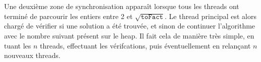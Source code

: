 \documentclass[a4paper,10pt]{article}
\begin{document}
Une deuxième zone de synchronisation apparaît lorsque tous les threads ont terminé de parcourir les entiers entre 2 et $\sqrt{\texttt{toFact}}$. Le thread principal est alors chargé de vérifier si une solution a été trouvée, et sinon de continuer l'algorithme avec le nombre suivant présent sur le heap. Il fait cela de manière très simple, en tuant les $n$ threads, effectuant les vérifcations, puis éventuellement en relançant $n$ nouveaux threads.
\end{document}
